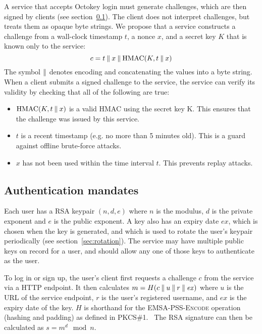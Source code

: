 A service that accepts Octokey login must generate challenges, which are then signed by clients (see
section~\ref{sec:mandates}). The client does not interpret challenges, but treats them as opaque
byte strings. We propose that a service constructs a challenge from a wall-clock timestamp $t$, a
nonce $x$, and a secret key $K$ that is known only to the service:
$$c = t \mathbin{\|} x \mathbin{\|} \mathrm{HMAC}(K, t \mathbin{\|} x)$$
The symbol $\mathbin{\|}$ denotes encoding and concatenating the values into a byte string. When a client
submits a signed challenge to the service, the service can verify its validity by checking that all
of the following are true:
\begin{itemize}
\item $\mathrm{HMAC}(K, t \mathbin{\|} x)$ is a valid HMAC using the secret key K. This ensures that the
challenge was issued by this service.
\item $t$ is a recent timestamp (e.g. no more than 5 minutes old). This is a guard against offline
brute-force attacks.
\item $x$ has not been used within the time interval $t$. This prevents replay attacks.
\end{itemize}

\subsection{Authentication mandates}\label{sec:mandates}

Each user has a RSA keypair $(n, d, e)$ where $n$ is the modulus, $d$ is the private exponent and
$e$ is the public exponent. A key also has an expiry date $\mathit{ex}$, which is chosen when the
key is generated, and which is used to rotate the user's keypair periodically (see
section~\ref{sec:rotation}). The service may have multiple public keys on record for a user, and
should allow any one of those keys to authenticate as the user.

To log in or sign up, the user's client first requests a challenge $c$ from the service via a HTTP
endpoint. It then calculates $m = H(c \mathbin{\|} u \mathbin{\|} r \mathbin{\|} \mathit{ex})$ where $u$ is the URL
of the service endpoint, $r$ is the user's registered username, and $\mathit{ex}$ is the expiry date
of the key. $H$ is shorthand for the \textsc{EMSA-PSS-Encode} operation (hashing and padding) as
defined in PKCS\#1.~\cite{PKCS1} The RSA signature can then be calculated as $s = m^d \mod n$.

